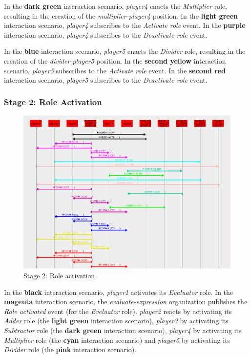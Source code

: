 In the \textbf{dark green} interaction scenario, \textit{player4} enacts the \textit{Multiplier} role, resulting in the creation of the \textit{multiplier-player4} position.
In the \textbf{light green} interaction scenario, \textit{player4} subscribes to the \textit{Activate role} event.
In the \textbf{purple} interaction scenario, \textit{player4} subscribes to the \textit{Deactivate role} event.

In the \textbf{blue} interaction scenario, \textit{player5} enacts the \textit{Divider} role, resulting in the creation of the \textit{divider-player5} position.
In the \textbf{second yellow} interaction scenario, \textit{player5} subscribes to the \textit{Activate role} event.
In the \textbf{second red} interaction scenario, \textit{player5} subscribes to the \textit{Deactivate role} event.

\subsubsection*{Stage 2: Role Activation}

\begin{figure}[H]
	\centering
	\includegraphics[width=\textwidth]{images/examples/example2-stage2.png}
	\caption{Stage 2: Role activation}
	\label{figure:example2-stage2}
\end{figure}

In the \textbf{black} interaction scenario, \textit{player1} activates its \textit{Evaluator} role.
In the \textbf{magenta} interaction scenario, the \textit{evaluate-expression} organization publishes the \textit{Role activated} event (for the \textit{Eveluator} role).
\textit{player2} reacts by activating its \textit{Adder} role (the \textbf{light green} interaction scenario), \textit{player3} by activating its \textit{Subtractor} role (the \textbf{dark green} interaction scenario), \textit{player4} by activating its \textit{Multiplier} role (the \textbf{cyan} interaction scenario) and \textit{player5} by activating its \textit{Divider} role (the \textbf{pink} interaction scenario).

